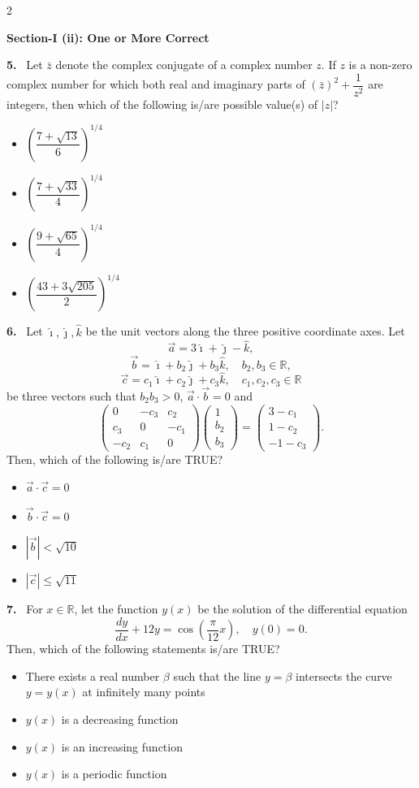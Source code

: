 \documentclass[10pt]{extarticle}
\newcommand{\sect}[1]{\par\smallskip\noindent\textbf{#1}\par}
\newcommand{\qn}[1]{\par\smallskip\noindent\textbf{#1.}~}
\newenvironment{qoptions}{\begin{itemize}[leftmargin=1.8em,itemsep=1pt,topsep=2pt,label={}]}{\end{itemize}}
\newcommand{\opt}[2]{\item[(#1)] #2}
\begin{document}
\begin{multicols}{2}
\sect{Section-I (ii): One or More Correct}

\qn{5} Let $\bar z$ denote the complex conjugate of a complex number $z$. If $z$ is a non-zero complex number for which both real and imaginary parts of $(\bar z)^2 + \dfrac{1}{z^2}$ are integers, then which of the following is/are possible value(s) of $|z|$?
\begin{qoptions}
\opt{A}{$\left(\dfrac{7+\sqrt{13}}{6}\right)^{1/4}$}
\opt{B}{$\left(\dfrac{7+\sqrt{33}}{4}\right)^{1/4}$}
\opt{C}{$\left(\dfrac{9+\sqrt{65}}{4}\right)^{1/4}$}
\opt{D}{$\left(\dfrac{43+3\sqrt{205}}{2}\right)^{1/4}$}
\end{qoptions}

\qn{6} Let $\hat\imath,\hat\jmath,\hat k$ be the unit vectors along the three positive coordinate axes. Let
$$\vec a = 3\hat\imath+\hat\jmath-\hat k,$$
$$\vec b = \hat\imath+b_2\hat\jmath+b_3\hat k,\quad b_2,b_3\in\mathbb{R},$$
$$\vec c = c_1\hat\imath+c_2\hat\jmath+c_3\hat k,\quad c_1,c_2,c_3\in\mathbb{R}$$
be three vectors such that $b_2b_3>0$, $\vec a\cdot\vec b=0$ and
$$\begin{pmatrix}0 & -c_3 & c_2\\ c_3 & 0 & -c_1\\ -c_2 & c_1 & 0\end{pmatrix}\begin{pmatrix}1\\ b_2\\ b_3\end{pmatrix} = \begin{pmatrix}3-c_1\\ 1-c_2\\ -1-c_3\end{pmatrix}.$$
Then, which of the following is/are TRUE?
\begin{qoptions}
\opt{A}{$\vec a\cdot\vec c = 0$}
\opt{B}{$\vec b\cdot\vec c = 0$}
\opt{C}{$|\vec b| < \sqrt{10}$}
\opt{D}{$|\vec c| \le \sqrt{11}$}
\end{qoptions}

\qn{7} For $x\in\mathbb{R}$, let the function $y(x)$ be the solution of the differential equation
$$\dfrac{dy}{dx}+12y = \cos\left(\dfrac{\pi}{12}x\right),\quad y(0)=0.$$
Then, which of the following statements is/are TRUE?
\begin{qoptions}
\opt{A}{There exists a real number $\beta$ such that the line $y=\beta$ intersects the curve $y=y(x)$ at infinitely many points}
\opt{B}{$y(x)$ is a decreasing function}
\opt{C}{$y(x)$ is an increasing function}
\opt{D}{$y(x)$ is a periodic function}
\end{qoptions}


\end{multicols}
\end{document}
